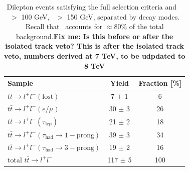 \begin{table}[!ht]
\begin{center}
\begin{tabular}{l|c|c}
\hline
            Sample					&                Yield   & 	Fraction [\%]\\
\hline
\hline
$t\bar{t} \rightarrow l^{+}l^{-} (\mathrm{lost})$   &       7 $\pm$ 1 	& 	6\\
$t\bar{t} \rightarrow l^{+}l^{-} (e/\mu)$   &      30 $\pm$ 3  	& 26\\
$t\bar{t} \rightarrow l^{+}l^{-} (\tau_{\mathrm{lep}})$   &      21 $\pm$ 2  	& 18\\
$t\bar{t} \rightarrow l^{+}l^{-} (\tau_{\mathrm{had}}\rightarrow \mathrm{1-prong})$   &      39 $\pm$ 3  & 34\\
$t\bar{t} \rightarrow l^{+}l^{-} (\tau_{\mathrm{had}}\rightarrow \mathrm{3-prong})$   &      19 $\pm$ 2  & 16\\
\hline
         total $t\bar{t} \rightarrow l^{+}l^{-} $  &     117 $\pm$ 5  & 100\\
\hline
\end{tabular}
\caption{Dilepton events satisfying the full selection criteria
 and \met\ $>$ 100 GeV, \mt\ $>$ 150 GeV,  separated by decay modes.
Recall that \ttll\ accounts for $\approx80$\% of the total
background.{\bf Fix me: Is this before or after the isolated track
  veto? This is after the isolated track veto, numbers derived at 7
  TeV, to be udpdated to 8 TeV}
\label{tab:ttdlcomposition}}
\end{center}
\end{table}

